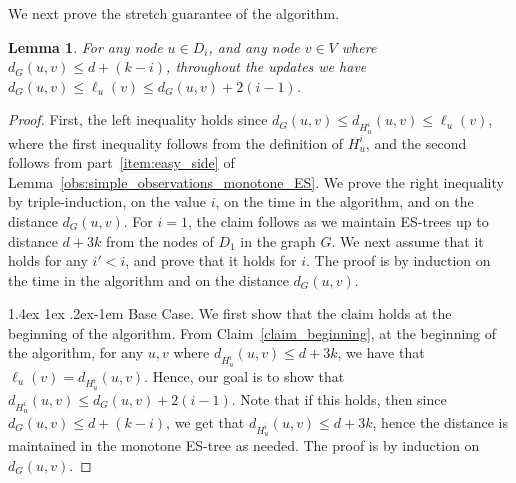 \documentclass[11pt]{article}
\makeatletter
\newtheorem{lemma}[theorem]{Lemma}
\theoremstyle{definition}
\theoremstyle{remark}
\newcommand{\mtodo}[1]{\todo[color=red!20]{M: #1}}
\renewcommand{\paragraph}{%
  \@startsection{paragraph}{4}%
  {\z@}{1.4ex \@plus 1ex \@minus .2ex}{-1em}%
  {\normalfont\normalsize\bfseries}%
}
\makeatother
\begin{document}

We next prove the stretch guarantee of the algorithm.


\begin{lemma}\label{lem_additive_stretch}
For any node $u \in D_i$, and any node $v \in V$ where $d_G(u,v) \leq d+(k-i)$, throughout the updates we have $d_G(u,v) \leq \ell_u(v) \leq  d_G(u,v)+ 2(i-1)$.
\end{lemma}

\begin{proof}
First, the left inequality holds since $d_G(u,v) \leq d_{H_u^i}(u,v) \leq \ell_u(v)$, where the first inequality follows from the definition of $H_u^i$, and the second follows from part~\ref{item:easy_side} of Lemma~\ref{obs:simple_observations_monotone_ES}.
We prove the right inequality by triple-induction, on the value $i$, on the time in the algorithm, and on the distance $d_G(u,v)$.
For $i=1$, the claim follows as we maintain ES-trees up to distance $d+3k$ from the nodes of $D_1$ in the graph $G$. We next assume that it holds for any $i' < i$, and prove that it holds for $i$. The proof is by induction on the time in the algorithm and on the distance $d_G(u,v)$.

\paragraph{Base Case.} We first show that the claim holds at the beginning of the algorithm. From Claim~\ref{claim_beginning}, at the beginning of the algorithm, for any $u,v$ where $d_{H_u^i}(u,v) \leq d+3k$, we have that $\ell_u(v) = d_{H_u^i}(u,v).$ Hence, our goal is to show that $d_{H_u^i}(u,v) \leq d_G(u,v) + 2(i-1)$. Note that if this holds, then since $d_G(u,v) \leq d+(k-i)$, we get that $d_{H_u^i}(u,v) \leq d+3k$, hence the distance is maintained in the monotone ES-tree as needed.
The proof is by induction on $d_G(u,v)$.


\end{proof}
\end{document}
